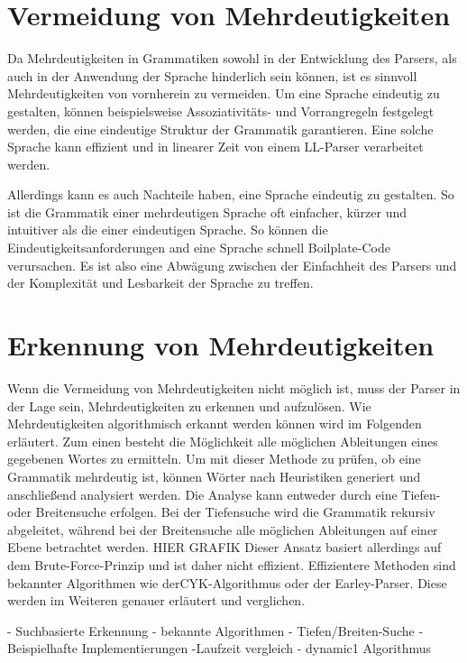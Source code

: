 \documentclass[runningheads]{llncs}
\begin{document}
	\section{Vermeidung von Mehrdeutigkeiten}

	Da Mehrdeutigkeiten in Grammatiken sowohl in der Entwicklung des Parsers,
	als auch in der Anwendung der Sprache hinderlich sein können,
	ist es sinnvoll Mehrdeutigkeiten von vornherein zu vermeiden.
	Um eine Sprache eindeutig zu gestalten,
	können beispielsweise Assoziativitäts- und Vorrangregeln festgelegt werden,
	die eine eindeutige Struktur der Grammatik garantieren. \cite{wharton1976}
	Eine solche Sprache kann effizient und in linearer Zeit von einem LL-Parser verarbeitet werden.

	Allerdings kann es auch Nachteile haben, eine Sprache eindeutig zu gestalten.
	So ist die Grammatik einer mehrdeutigen Sprache oft einfacher, kürzer und intuitiver als die einer eindeutigen Sprache.
	So können die Eindeutigkeitsanforderungen and eine Sprache schnell Boilplate-Code verursachen.
	Es ist also eine Abwägung zwischen der Einfachheit des Parsers und der Komplexität und Lesbarkeit der Sprache zu treffen.


	\section{Erkennung von Mehrdeutigkeiten}

	Wenn die Vermeidung von Mehrdeutigkeiten nicht möglich ist,
	muss der Parser in der Lage sein, Mehrdeutigkeiten zu erkennen und aufzulösen.
	Wie Mehrdeutigkeiten algorithmisch erkannt werden können wird im Folgenden erläutert.
	Zum einen besteht die Möglichkeit alle möglichen Ableitungen eines gegebenen Wortes zu ermitteln.
	Um mit dieser Methode zu prüfen, ob eine Grammatik mehrdeutig ist,
	können Wörter nach Heuristiken generiert und anschließend analysiert werden.
	Die Analyse kann entweder durch eine Tiefen- oder Breitensuche erfolgen.
	Bei der Tiefensuche wird die Grammatik rekursiv abgeleitet,
	während bei der Breitensuche alle möglichen Ableitungen auf einer Ebene betrachtet werden.
	HIER GRAFIK
	Dieser Ansatz basiert allerdings auf dem Brute-Force-Prinzip und ist daher nicht effizient.
	Effizientere Methoden sind bekannter Algorithmen wie derCYK-Algorithmus oder der Earley-Parser.
	Diese werden im Weiteren genauer erläutert und verglichen.

	- Suchbasierte Erkennung
	- bekannte Algorithmen
	- Tiefen/Breiten-Suche
	- Beispielhafte Implementierungen
	-Laufzeit vergleich
	- dynamic1 Algorithmus
\end{document}
